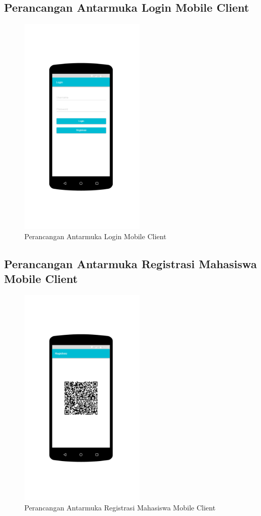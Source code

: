 \subsection{Perancangan Antarmuka Login Mobile Client }
	\begin{figure}[H]
		\includegraphics[width=6cm]{figures/diagram/image120.png}
		\centering
		\caption{Perancangan Antarmuka Login Mobile Client}
	\end{figure}
\subsection{Perancangan Antarmuka Registrasi Mahasiswa Mobile Client }
	\begin{figure}[H]
		\includegraphics[width=6cm]{figures/diagram/image121.png}
		\centering
		\caption{Perancangan Antarmuka Registrasi Mahasiswa Mobile Client}
	\end{figure}
